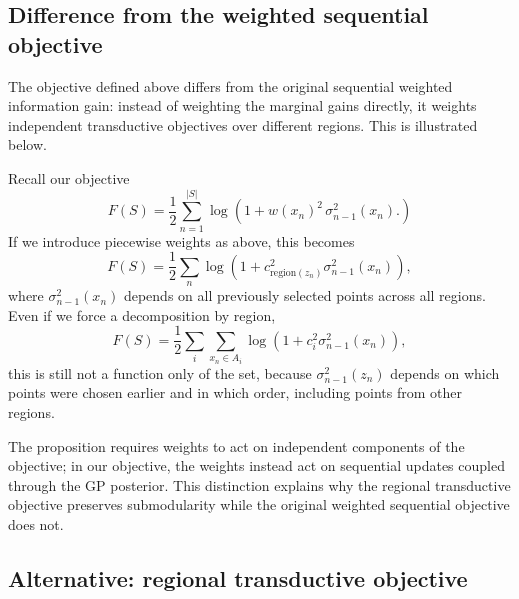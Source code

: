 \subsection{Difference from the weighted sequential objective}
The objective defined above differs from the original sequential weighted information gain: instead of weighting the marginal gains directly, it weights independent transductive objectives over different regions. This is illustrated below.

Recall our objective
\begin{equation*}
F(S)
= \frac{1}{2}
\sum_{n=1}^{|S|}
\log\!\left(
1+w(x_n)^2\,\sigma_{n-1}^2(x_n).
\right)
\end{equation*}
If we introduce piecewise weights as above, this becomes
\begin{equation*}
F(S)
= \frac{1}{2}
\sum_n
\log\!\left(
1+c_{\mathrm{region}(z_n)}^2
\sigma_{n-1}^2(x_n)
\right),
\end{equation*}
where $\sigma_{n-1}^2(x_n)$
depends on all previously selected points across all regions.
Even if we force a decomposition by region,
\begin{equation*}
F(S)
= \frac{1}{2}
\sum_i
\sum_{x_n \in A_i}
\log\!\left(
1+c_i^2
\sigma_{n-1}^2(x_n)
\right),
\end{equation*}
this is still not a function only of the set, because
$\sigma_{n-1}^2(z_n)$
depends on which points were chosen earlier and in which order, including points from other regions.

The proposition requires weights to act on independent components of the
objective; in our objective, the weights instead act on sequential updates
coupled through the GP posterior. This distinction explains why the
regional transductive objective preserves submodularity while the original
weighted sequential objective does not.

\subsection{Alternative: regional transductive objective}
\label{app:transobjective}

